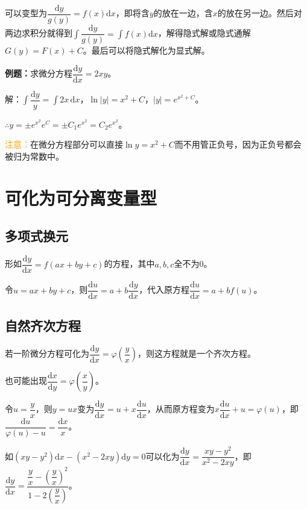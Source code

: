 \documentclass[UTF8, 12pt]{ctexart}
\begin{document}
可以变型为$\dfrac{\textrm{d}y}{g(y)}=f(x)\textrm{d}x$，即将含$y$的放在一边，含$x$的放在另一边。然后对两边求积分就得到$\displaystyle{\int\dfrac{\textrm{d}y}{g(y)}=\int f(x)\textrm{d}x}$，解得隐式解或隐式通解$G(y)=F(x)+C$。最后可以将隐式解化为显式解。

\textbf{例题：}求微分方程$\dfrac{\textrm{d}y}{\textrm{d}x}=2xy$。

解：$\displaystyle{\int\dfrac{\textrm{d}y}{y}}=\int2x\,\textrm{d}x$，$\ln\vert y\vert=x^2+C$，$\vert y\vert=e^{x^2+C}$。

$\therefore y=\pm e^{x^2}e^C=\pm C_1e^{x^2}=C_2e^{x^2}$。

\textcolor{orange}{注意：}在微分方程部分可以直接$\ln y=x^2+C$而不用管正负号，因为正负号都会被归为常数中。

\section{可化为可分离变量型}

\subsection{多项式换元}

形如$\dfrac{\textrm{d}y}{\textrm{d}x}=f(ax+by+c)$的方程，其中$a,b,c$全不为0。

令$u=ax+by+c$，则$\dfrac{\textrm{d}u}{\text{d}x}=a+b\dfrac{\textrm{d}y}{\textrm{d}x}$，代入原方程$\dfrac{\textrm{d}u}{\textrm{d}x}=a+bf(u)$。

\subsection{自然齐次方程}

若一阶微分方程可化为$\dfrac{\textrm{d}y}{\textrm{d}x}=\varphi\left(\dfrac{y}{x}\right)$，则这方程就是一个齐次方程。

也可能出现$\dfrac{\textrm{d}x}{\textrm{d}y}=\varphi\left(\dfrac{x}{y}\right)$。

令$u=\dfrac{y}{x}$，则$y=ux$变为$\dfrac{\textrm{d}y}{\textrm{d}x}=u+x\dfrac{\textrm{d}u}{\textrm{d}x}$，从而原方程变为$x\dfrac{\textrm{d}u}{\textrm{d}x}+u=\varphi(u)$，即$\dfrac{\textrm{d}u}{\varphi(u)-u}=\dfrac{\textrm{d}x}{x}$。

如$(xy-y^2)\textrm{d}x-(x^2-2xy)\textrm{d}y=0$可以化为$\dfrac{\textrm{d}y}{\textrm{d}x}=\dfrac{xy-y^2}{x^2-2xy}$，即$\dfrac{\textrm{d}y}{\textrm{d}x}=\dfrac{\dfrac{y}{x}-\left(\dfrac{y}{x}\right)^2}{1-2\left(\dfrac{y}{x}\right)}$。
\end{document}
